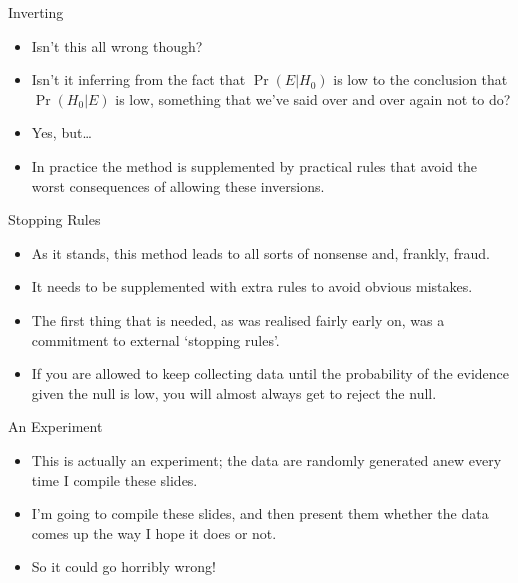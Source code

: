 \documentclass[
  ignorenonframetext,
]{beamer}
\providecommand{\tightlist}{%
  \setlength{\itemsep}{0pt}\setlength{\parskip}{0pt}}
\renewcommand{\,}{\text{, }}
\begin{document}
\begin{frame}{Inverting}
\protect\hypertarget{inverting}{}
\begin{itemize}
\tightlist
\item
  Isn't this all wrong though?
\item
  Isn't it inferring from the fact that \(\Pr(E | H_0)\) is low to the
  conclusion that \(\Pr(H_0 | E)\) is low, something that we've said
  over and over again not to do? \pause
\item
  Yes, but\ldots{} \pause
\item
  In practice the method is supplemented by practical rules that avoid
  the worst consequences of allowing these inversions.
\end{itemize}
\end{frame}

\begin{frame}{Stopping Rules}
\protect\hypertarget{stopping-rules}{}
\begin{itemize}
\tightlist
\item
  As it stands, this method leads to all sorts of nonsense and, frankly,
  fraud.
\item
  It needs to be supplemented with extra rules to avoid obvious
  mistakes.
\item
  The first thing that is needed, as was realised fairly early on, was a
  commitment to external `stopping rules'.
\item
  If you are allowed to keep collecting data until the probability of
  the evidence given the null is low, you will almost always get to
  reject the null.
\end{itemize}
\end{frame}

\begin{frame}{An Experiment}
\protect\hypertarget{an-experiment}{}
\begin{itemize}
\tightlist
\item
  This is actually an experiment; the data are randomly generated anew
  every time I compile these slides.
\item
  I'm going to compile these slides, and then present them whether the
  data comes up the way I hope it does or not.
\item
  So it could go horribly wrong!
\end{itemize}
\end{frame}
\end{document}
